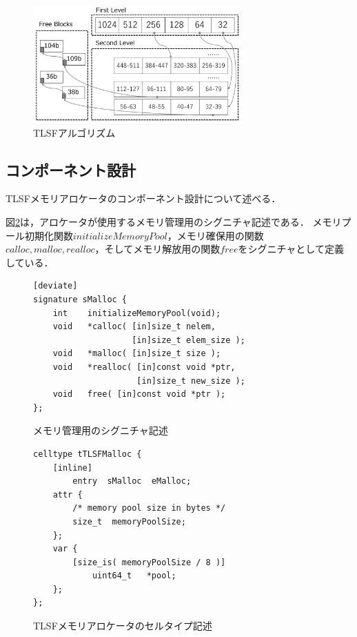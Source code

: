 \documentclass[submit,techrep]{ipsj_v2/UTF8/ipsj}
\begin{document}
\begin{figure}[t]
    \centering
    \includegraphics[width=8cm,clip]{figure/TLSF.pdf}
    \caption{TLSFアルゴリズム}
    \label{fig:TLSF}
\end{figure}


\subsection{コンポーネント設計}

TLSFメモリアロケータのコンポーネント設計について述べる．

図\ref{src:TLSFSignature}は，アロケータが使用するメモリ管理用のシグニチャ記述である．
メモリプール初期化関数$initializeMemoryPool$，メモリ確保用の関数$calloc, malloc, realloc$，そしてメモリ解放用の関数$free$をシグニチャとして定義している．




\begin{figure}[t]
\centering
\begin{lstlisting}
[deviate]
signature sMalloc {
    int    initializeMemoryPool(void);
    void   *calloc( [in]size_t nelem,
                    [in]size_t elem_size );
    void   *malloc( [in]size_t size );
    void   *realloc( [in]const void *ptr,
                     [in]size_t new_size );
    void   free( [in]const void *ptr );
};
\end{lstlisting}
\caption{メモリ管理用のシグニチャ記述}  
\label{src:TLSFSignature}
\end{figure}

\begin{figure}[t]
\centering
\begin{lstlisting}
celltype tTLSFMalloc {
    [inline]
        entry  sMalloc  eMalloc;
    attr {
        /* memory pool size in bytes */
        size_t  memoryPoolSize;
    };
    var {
        [size_is( memoryPoolSize / 8 )]
            uint64_t   *pool;
    };
};
\end{lstlisting}
\caption{TLSFメモリアロケータのセルタイプ記述}  
\label{src:TLSFCelltype}
\end{figure}
\end{document}
